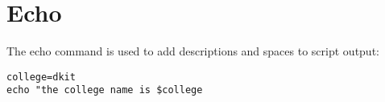 \documentclass[slides]{pgnotes}
\begin{document}
\section{Echo}\label{echo}

The echo command is used to add descriptions and spaces to script output:

\begin{verbatim}
college=dkit
echo "the college name is $college
\end{verbatim}
\end{document}
